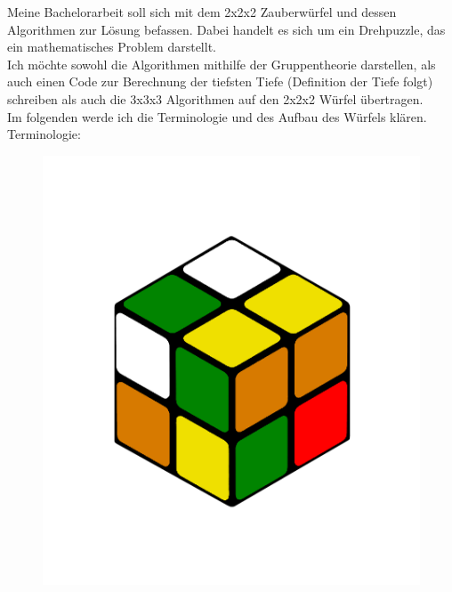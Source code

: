 \documentclass[12pt,a4paper, usenames, dvipsnames]{scrartcl}
\begin{document}
Meine Bachelorarbeit soll sich mit dem 2x2x2 Zauberwürfel und dessen Algorithmen zur Lösung befassen. Dabei handelt es sich um ein Drehpuzzle, das ein mathematisches Problem darstellt. \\ 
Ich möchte sowohl die Algorithmen mithilfe der Gruppentheorie darstellen, als auch einen Code zur Berechnung der tiefsten Tiefe (Definition der Tiefe folgt) schreiben als auch die 3x3x3 Algorithmen auf den 2x2x2 Würfel übertragen. \\
Im folgenden werde ich die Terminologie und des Aufbau des Würfels klären.\\
Terminologie:
\begin{figure}[h]
\centering
\includegraphics[scale=0.1]{2x2scrambled.png}

\end{figure}
\end{document}
